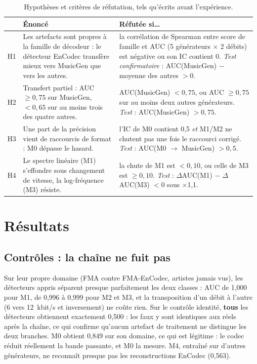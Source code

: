 \documentclass[a4paper, 11pt]{article}
\begin{document}
\begin{table}[h]
    \centering
    \small
    \begin{tabularx}{\textwidth}{lYY}
        \toprule
        & Énoncé & Réfutée si\dots \\
        \midrule
        H1 & Les artefacts sont propres à la famille de décodeur : le détecteur EnCodec transfère mieux vers
        MusicGen que vers les autres. &
        la corrélation de Spearman entre score de famille et AUC (5 générateurs $\times$ 2 débits) est
        négative ou son IC contient 0. \emph{Test confirmatoire} : AUC(MusicGen) $-$ moyenne des autres $> 0$. \\
        H2 & Transfert partiel : AUC $\geq 0{,}75$ sur MusicGen, $< 0{,}65$ sur au moins trois des quatre
        autres. &
        AUC(MusicGen) $< 0{,}75$, ou AUC $\geq 0{,}75$ sur au moins deux autres générateurs.
        \emph{Test} : AUC(MusicGen) $> 0{,}75$. \\
        H3 & Une part de la précision vient de raccourcis de format : M0 dépasse le hasard. &
        l'IC de M0 contient 0,5 \emph{et} M1/M2 ne chutent pas une fois le raccourci corrigé.
        \emph{Test} : AUC(M0 $\to$ MusicGen) $> 0{,}5$. \\
        H4 & Le spectre linéaire (M1) s'effondre sous changement de vitesse, la log-fréquence (M3) résiste. &
        la chute de M1 est $< 0{,}10$, ou celle de M3 est $\geq 0{,}10$.
        \emph{Test} : $\Delta$AUC(M1) $-$ $\Delta$AUC(M3) $< 0$ sous $\times$1,1. \\
        \bottomrule
    \end{tabularx}
    \caption{Hypothèses et critères de réfutation, tels qu'écrits avant l'expérience.}
    \label{tab:hypotheses}
\end{table}

\section{Résultats}

\subsection{Contrôles : la chaîne ne fuit pas}

Sur leur propre domaine (FMA contre FMA-EnCodec, artistes jamais vus), les détecteurs appris séparent
presque parfaitement les deux classes : AUC de 1,000 pour M1, de 0,996 à 0,999 pour M2 et M3, et la
transposition d'un débit à l'autre (6 vers 12~kbit/s et inversement) ne coûte rien. Sur le contrôle
identité, \textbf{tous} les détecteurs obtiennent exactement 0,500 : les faux y sont identiques aux réels
après la chaîne, ce qui confirme qu'aucun artefact de traitement ne distingue les deux branches. M0 obtient
0,849 sur son domaine, ce qui est légitime : le codec réduit réellement la bande passante, et M0 la mesure.
M4, entraîné sur d'autres générateurs, ne reconnaît presque pas les reconstructions EnCodec (0,563).
\end{document}
